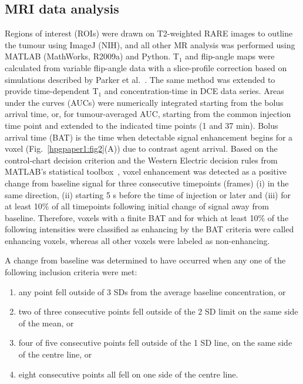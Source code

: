 \subsection{MRI data analysis}

Regions of interest (ROIs) were drawn on T2-weighted RARE images to outline the tumour using ImageJ (NIH), and all other MR analysis was performed using MATLAB (MathWorks, R2009a) and Python.
T$_1$ and flip-angle maps were calculated from variable flip-angle data with a slice-profile correction based on simulations described by Parker et al.~\cite{Parker:2001wj}.
The same method was extended to provide time-dependent T$_1$ and concentration-time in DCE data series.
Areas under the curves (AUCs) were numerically integrated starting from the bolus arrival time, or, for tumour-averaged AUC, starting from the common injection time point and extended to the indicated time points (1 and 37 min).
Bolus arrival time (BAT) is the time when detectable signal enhancement begins for a voxel (Fig.~\ref{hpgpaper1:fig2}(A)) due to contrast agent arrival.
Based on the control-chart decision criterion and the Western Electric decision rules from MATLAB’s statistical toolbox~\cite{Shewhart:1931tq}, voxel enhancement was detected as a positive change from baseline signal for three consecutive timepoints (frames) (i) in the same direction, (ii) starting 5 s before the time of injection or later and (iii) for at least 10\% of all timepoints following initial change of signal away from baseline.
Therefore, voxels with a finite BAT and for which at least 10\% of the following intensities were classified as enhancing by the BAT criteria were called enhancing voxels, whereas all other voxels were labeled as non-enhancing.

A change from baseline was determined to have occurred
when any one of the following inclusion criteria were met:

\begin{enumerate}
	\item any point fell outside of 3 SDs from the average baseline concentration, or
	\item two of three consecutive points fell outside of the 2 SD limit on the same side of the mean, or
	\item four of five consecutive points fell outside of the 1 SD line, on the same side of the centre line, or
	\item eight consecutive points all fell on one side of the centre line.
\end{enumerate}

